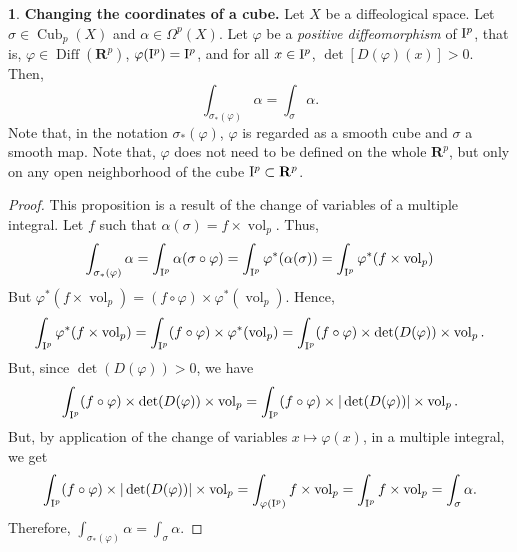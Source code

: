 \documentclass[11pt,reqno]{amsart}
\theoremstyle{definition}
\newtheorem{article}{}
\newcommand{\artlabel}[1]{{\bf #1.}}
\newcommand{\RR}{{\mathbf R}}
\def \D{{D}}
\def \X{{X}}
\newcommand{\cub}[1]{{\rm I}^{#1}}
\newcommand{\DCubes}[1]{\operatorname{Cub}_{#1}}
\newcommand{\Diff}{\operatorname{Diff}}
\newcommand{\vol}{\operatorname{vol}}
\begin{document}
  \begin{article}\artlabel{Changing the coordinates of a cube} 
    \label{Changing-the-coordinates-of-a-cube}
    Let $\X$ be a diffeological space. Let
    $\sigma \in \DCubes{p}(\X)$ and $\alpha \in \Omega^p(\X)$. Let $\varphi$ be
    a {\em positive diffeomorphism} of $\cub{p}$, that is, 
    $\varphi \in \Diff(\RR^p)$, $\varphi(\cub{p}) = \cub{p}$, and for all
    $x \in \cub{p}$, $\det[\D(\varphi)(x)]>0$. Then,
    $$ \int_{\sigma_*(\varphi)}
      \alpha = \int_\sigma \alpha. $$ 
    Note that, in the notation
    $\sigma_*(\varphi)$, $\varphi$ is regarded as a smooth
    cube and $\sigma$ a smooth map. Note that, $\varphi$
    does not need to be defined on the whole $\RR^p$, but only
    on any open neighborhood of the cube $\cub{p} \subset \RR^p$.
  \end{article} %
  
  \begin{proof}
    This proposition is a result of the change of variables
    of a multiple integral. Let $f$ such that $\alpha(\sigma)
      = f \times \vol_p$. Thus, 
    $$
      \int_{\sigma_*(\varphi)}\alpha = \int_{\cub{p}}\alpha
      (\sigma \circ \varphi)
      = \int_{\cub{p}}\varphi^*(\alpha(\sigma)) 
      = \int_{\cub{p}}\varphi^*(f \times \vol_p) 
      $$
    But $\varphi^*(f \times \vol_p) = (f \circ \varphi)
      \times \varphi^*(\vol_p)$. Hence,
    $$
      \int_{\cub{p}}\varphi^*(f \times \vol_p) =
      \int_{\cub{p}}(f \circ \varphi)
      \times \varphi^*(\vol_p)
      = \int_{\cub{p}}(f \circ \varphi) \times
      \det(\D(\varphi)) \times \vol_p.
      $$
    But, since $\det(\D(\varphi))>0$, we have
    $$
      \int_{\cub{p}}(f \circ \varphi) \times
      \det(\D(\varphi)) \times \vol_p = \int_{\cub{p}}(f
      \circ \varphi) \times \vert \det(\D(\varphi)) \vert
      \times \vol_p.
      $$
    But, by application of the change of
    variables $x \mapsto \varphi(x)$, in a multiple
    integral, we get
    $$
      \int_{\cub{p}}(f
      \circ \varphi) \times \vert \det(\D(\varphi)) \vert
      \times \vol_p
      = \int_{\varphi(\cub{p})}f \times \vol_p 
      = \int_{\cub{p}}f \times \vol_p
      = \int_\sigma \alpha.
      $$
    Therefore, $\displaystyle \int_{\sigma_*(\varphi)} \alpha
      = \int_\sigma \alpha$.
  \end{proof}
  
  
\end{document}
